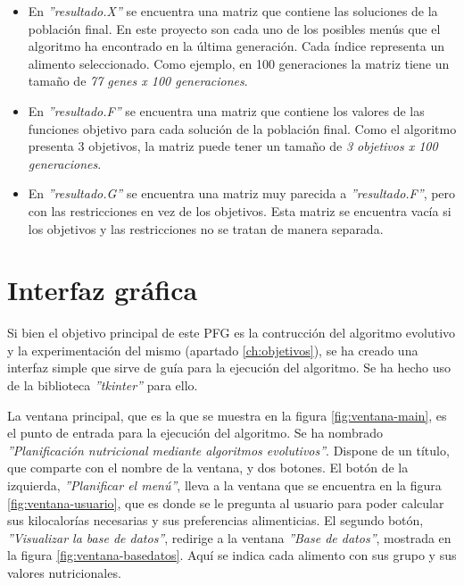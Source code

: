 \begin{itemize}
    \item En \textit{''resultado.X''} se encuentra una matriz que contiene las soluciones de la población final. En este proyecto son cada uno de los posibles menús que el algoritmo ha encontrado en la última generación. Cada índice representa un alimento seleccionado. Como ejemplo, en 100 generaciones la matriz tiene un tamaño de \textit{77 genes x 100 generaciones}.
    \item En \textit{''resultado.F''} se encuentra una matriz que contiene los valores de las funciones objetivo para cada solución de la población final. Como el algoritmo presenta 3 objetivos, la matriz puede tener un tamaño de \textit{3 objetivos x 100 generaciones}.
    \item En \textit{''resultado.G''} se encuentra una matriz muy parecida a \textit{''resultado.F''}, pero con las restricciones en vez de los objetivos. Esta matriz se encuentra vacía si los objetivos y las restricciones no se tratan de manera separada.
\end{itemize}

\section{Interfaz gráfica}
\label{ch:interfaz-grafica}

Si bien el objetivo principal de este PFG es la contrucción del algoritmo evolutivo y la experimentación del mismo (apartado \ref{ch:objetivos}), se ha creado una interfaz simple que sirve de guía para la ejecución del algoritmo. Se ha hecho uso de la biblioteca \textit{''tkinter''} para ello.

La ventana principal, que es la que se muestra en la figura \ref{fig:ventana-main}, es el punto de entrada para la ejecución del algoritmo. Se ha nombrado \textit{''Planificación nutricional mediante algoritmos evolutivos''}. Dispone de un título, que comparte con el nombre de la ventana, y dos botones. El botón de la izquierda, \textit{''Planificar el menú''}, lleva a la ventana que se encuentra en la figura \ref{fig:ventana-usuario}, que es donde se le pregunta al usuario para poder calcular sus kilocalorías necesarias y sus preferencias alimenticias. El segundo botón, \textit{''Visualizar la base de datos''}, redirige a la ventana \textit{''Base de datos''}, mostrada en la figura \ref{fig:ventana-basedatos}. Aquí se indica cada alimento con sus grupo y sus valores nutricionales.

